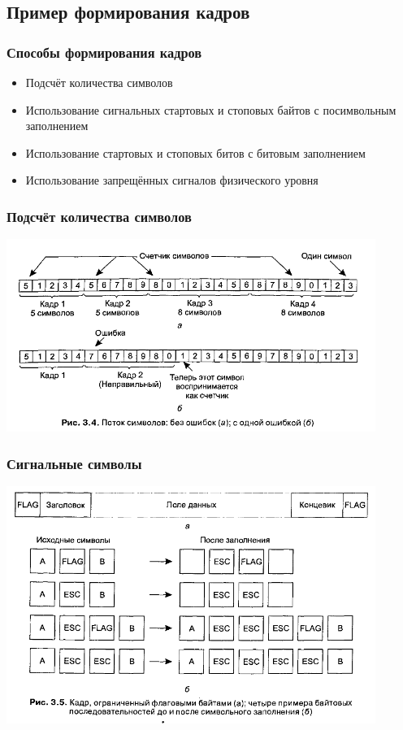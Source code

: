 \documentclass[utf8]{beamer}
\begin{document}
\subsection{Пример формирования кадров}
\begin{frame}
\frametitle{Способы формирования кадров}
\begin{itemize}
	\item Подсчёт количества символов
	\item Использование сигнальных стартовых и стоповых байтов с посимвольным заполнением
	\item Использование стартовых и стоповых битов с битовым заполнением
	\item Использование запрещённых сигналов физического уровня
\end{itemize}
\end{frame}
\begin{frame}
\frametitle{Подсчёт количества символов}
\begin{center}
\includegraphics[width=0.9\textwidth]{pic/byte-counted-frame.png}
\end{center}
\end{frame}
\begin{frame}
\frametitle{Сигнальные символы}
\begin{center}
\includegraphics[width=0.9\textwidth]{pic/symbol-delimiter.png}
\end{center}
\end{frame}
\end{document}
